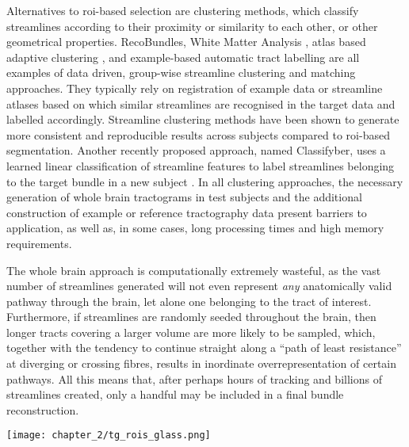 Alternatives to \gls{roi}-based selection are clustering methods, which classify streamlines according to their proximity or similarity to each other, or other geometrical properties.
RecoBundles\autocite{Garyfallidis2018}, White Matter Analysis \autocite{ODonnell2017, ODonnell2007}, atlas based adaptive clustering \autocite{Tunc2014}, and example-based automatic tract labelling \autocite{Yoo2015} are all examples of data driven, group-wise streamline clustering and matching approaches.
They typically rely on registration of example data or streamline atlases based on which similar streamlines are recognised in the target data and labelled accordingly.
Streamline clustering methods have been shown to generate more consistent and reproducible results across subjects compared to \gls{roi}-based segmentation\autocite{Sydnor2018}.
Another recently proposed approach, named Classifyber, uses a learned linear classification of streamline features to label streamlines belonging to the target bundle in a new subject \autocite{Berto2021}.
In all clustering approaches, the necessary generation of whole brain tractograms in test subjects and the additional construction of example or reference tractography data present barriers to application, as well as, in some cases, long processing times and high memory requirements\autocite{Wasserthal2018}.

The whole brain approach is computationally extremely wasteful, as the vast number of streamlines generated will not even represent \textit{any} anatomically valid pathway through the brain, let alone one belonging to the tract of interest.
Furthermore, if streamlines are randomly seeded throughout the brain, then longer tracts covering a larger volume are more likely to be sampled, which, together with the tendency to continue straight along a ``path of least resistance'' at diverging or crossing fibres, results in inordinate overrepresentation of certain pathways\autocite{Smith2013}.
All this means that, after perhaps hours of tracking and billions of streamlines created, only a handful may be included in a final bundle reconstruction.

\begin{SCfigure}
  \texttt{[image: chapter\_2/tg\_rois\_glass.png]}
  \caption[Virtual WM tract dissection with streamline tractography]{\Gls{wm} tracts are virtually dissected with streamline tractography and anatomically informed \glspl{roi}. In this toy example, streamlines for the \gls{cst} are seeded in the cerebral peduncles (blue ring) and selected with an inclusion \gls{roi} in the posterior limb of the internal capsule (green ring). Streamlines following the paths of the \gls{cc} or cerebellar peduncles are excluded (red rings).}
  \label{fig:tg_rois}
\end{SCfigure}


